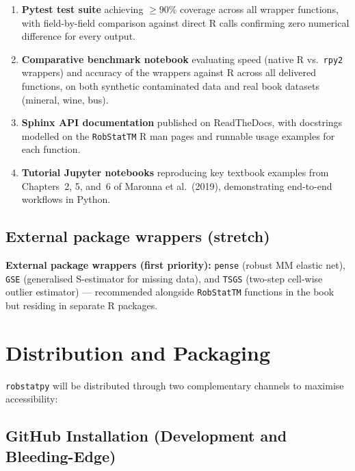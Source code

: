 \documentclass[11pt, a4paper]{article}
\begin{document}
\begin{enumerate}[leftmargin=2em, itemsep=4pt]
  \item \textbf{Pytest test suite} achieving $\geq 90\%$ coverage
    across all wrapper functions, with field-by-field comparison
    against direct R calls confirming zero numerical difference for
    every output.

  \item \textbf{Comparative benchmark notebook} evaluating speed
    (native R vs.\ \texttt{rpy2} wrappers) and accuracy of the wrappers
    against R across all delivered functions, on both synthetic contaminated
    data and real book datasets (mineral, wine, bus).

  \item \textbf{Sphinx API documentation} published on ReadTheDocs,
    with docstrings modelled on the \texttt{RobStatTM} R man pages
    and runnable usage examples for each function.

  \item \textbf{Tutorial Jupyter notebooks} reproducing key textbook
    examples from Chapters~2, 5, and~6 of Maronna et al.\ (2019),
    demonstrating end-to-end workflows in Python.
\end{enumerate}

\subsection{External package wrappers (stretch)}

\noindent
\textbf{External package wrappers (first priority):}
\texttt{pense} (robust MM elastic net), \texttt{GSE} (generalised
S-estimator for missing data), and \texttt{TSGS} (two-step cell-wise
outlier estimator) --- recommended alongside \texttt{RobStatTM} functions
in the book but residing in separate R packages.

\section{Distribution and Packaging}

\texttt{robstatpy} will be distributed through two complementary
channels to maximise accessibility:

\subsection{GitHub Installation (Development and Bleeding-Edge)}
\end{document}
